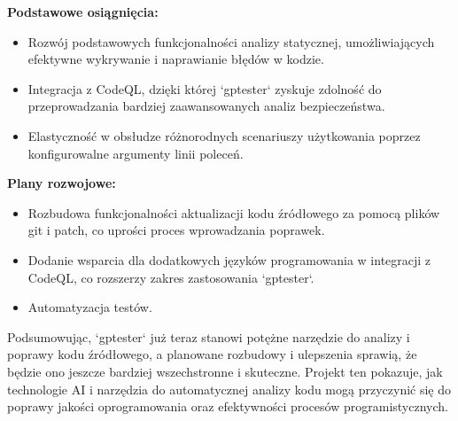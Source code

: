 \textbf{Podstawowe osiągnięcia:}
\begin{itemize}
    \item Rozwój podstawowych funkcjonalności analizy statycznej, umożliwiających efektywne wykrywanie i naprawianie błędów w kodzie.
    \item Integracja z CodeQL, dzięki której `gptester` zyskuje zdolność do przeprowadzania bardziej zaawansowanych analiz bezpieczeństwa.
    \item Elastyczność w obsłudze różnorodnych scenariuszy użytkowania poprzez konfigurowalne argumenty linii poleceń.
\end{itemize}

\textbf{Plany rozwojowe:}
\begin{itemize}
    \item Rozbudowa funkcjonalności aktualizacji kodu źródłowego za pomocą plików git i patch, co uprości proces wprowadzania poprawek.
    \item Dodanie wsparcia dla dodatkowych języków programowania w integracji z CodeQL, co rozszerzy zakres zastosowania `gptester`.
    \item Automatyzacja testów.
\end{itemize}

Podsumowując, `gptester` już teraz stanowi potężne narzędzie do analizy i poprawy kodu źródłowego, a planowane rozbudowy i ulepszenia sprawią, że będzie ono jeszcze bardziej wszechstronne i skuteczne. Projekt ten pokazuje, jak technologie AI i narzędzia do automatycznej analizy kodu mogą przyczynić się do poprawy jakości oprogramowania oraz efektywności procesów programistycznych.
